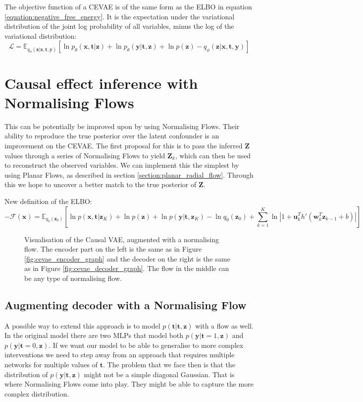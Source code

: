 \documentclass{report}
\newcommand{\E}{\mathbb{E}}
\newcommand{\bt}{\mathbf{t}}
\newcommand{\bu}{\mathbf{u}}
\newcommand{\bw}{\mathbf{w}}
\newcommand{\bx}{\mathbf{x}}
\newcommand{\by}{\mathbf{y}}
\newcommand{\bZ}{\mathbf{Z}}
\newcommand{\bz}{\mathbf{z}}
\begin{document}
The objective function of a CEVAE is of the same form as the ELBO in equation  \ref{equation:negative_free_energy}. It is the expectation under the variational distribution of the joint log probability of all variables, minus the log of the variational distribution:
\begin{equation}
    \mathcal{L} = \E_{q_\phi(\bz|\bx, \bt, \by)}[\ln p_\theta(\bx, \bt | \bz) + \ln p_\theta(\by |\bt, \bz) +\ln p(\bz) - q_\phi(\bz | \bx, \bt, \by)]
\end{equation}

\section{Causal effect inference with Normalising Flows}
This can be potentially be improved upon by using Normalising Flows. Their ability to reproduce the true posterior over the latent confounder is an improvement on the CEVAE. The first proposal for this is to pass the inferred $\bZ$ values through a series of Normalising Flows to yield $\bZ_k$, which can then be used to reconstruct the observed variables. We can implement this the simplest by using Planar Flows, as described in section \ref{section:planar_radial_flow}. Through this we hope to uncover a better match to the true posterior of $\bZ$.

\noindent
New definition of the ELBO:
\begin{equation}
    -\mathcal{F}(\bx) = \mathbb{E}_{q_0(\bz_0)}\left[\ln p(\bx, \bt | \bz_K) + \ln p(\bz) + \ln p(\by |\bt, \bz_K) - \ln q_0(\bz_0) + \sum\limits^K_{k=1} \ln \left| 1 + \bu_k^Th'(\bw^T_k\bz_{k-1} + b)\right| \right]
\end{equation}


\begin{figure}
    \centering
    
    \caption{Visualisation of the Causal VAE, augmented with a normalising flow. The encoder part on the left is the same as in Figure \ref{fig:cevae_encoder_graph} and the decoder on the right is the same as in Figure \ref{fig:cevae_decoder_graph}. The flow in the middle can be any type of normalising flow.}
    \label{fig:cenf_with_vae}
\end{figure}

\subsection{Augmenting decoder with a Normalising Flow}
A possible way to extend this approach is to model $p(\bt|\bt,\bz)$ with a flow as well. In the original model there are two MLPs that model both $p(\by|\bt=1,\bz)$ and $p(\by|\bt=0,\bz)$. If we want our model to be able to generalise to more complex interventions we need to step away from an approach that requires multiple networks for multiple values of $\bt$. The problem that we face then is that the distribution of $p(\by|\bt,\bz)$ might not be a simple diagonal Gaussian. That is where Normalising Flows come into play. They might be able to capture the more complex distribution. 
\end{document}
